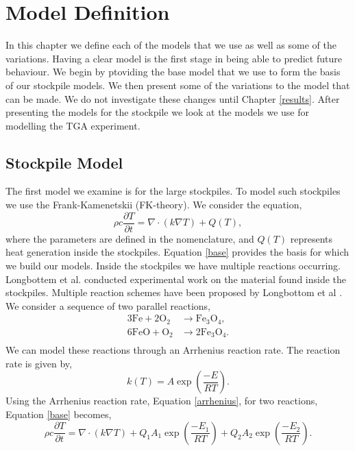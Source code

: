 \chapter{Model Definition}
In this chapter we define each of the models that we use as well as some of the variations. Having a clear model is the first stage in being able to predict future behaviour. We begin by ptoviding the base model that we use to form the basis of our stockpile models. We then present some of the variations to the model that can be made. We do not investigate these changes until Chapter \ref{results}. After presenting the models for the stockpile we look at the models we use for modelling the TGA experiment.

\section{Stockpile Model}
\label{Sec:stockpile}
The first model we examine is for the large stockpiles. To model such stockpiles we use the Frank-Kamenetskii (FK-theory). We consider the equation,
\begin{equation}
\rho c \frac{\partial T}{\partial t}=\nabla \cdot \left(k\nabla T\right) +Q(T), \label{base}
\end{equation}   
where the parameters are defined in the nomenclature, and $Q(T)$ represents heat generation inside the stockpiles. Equation \ref{base} provides the basis for which we build our models. Inside the stockpiles we have multiple reactions occurring. Longbottem et al. \cite{Ray19} conducted experimental work on the material found inside the stockpiles. Multiple reaction schemes have been proposed by Longbottom et al \cite{Ray19}. We consider a sequence of two parallel reactions,
\begin{align*}
3\text{Fe}+2\text{O}_2 &\rightarrow \text{Fe}_3\text{O}_4, \\
6\text{FeO}+\text{O}_2 &\rightarrow 2\text{Fe}_3\text{O}_4. \\
\end{align*} 
We can model these reactions through an Arrhenius reaction rate. The reaction rate is given by,
\begin{equation}
k(T)=A\exp\left(\frac{-E}{RT}\right). \label{arrhenius}
\end{equation} 
Using the Arrhenius reaction rate, Equation \ref{arrhenius}, for two reactions, Equation \ref{base} becomes,
\begin{equation}
\rho c \frac{\partial T}{\partial t}=\nabla \cdot \left(k\nabla T\right) +Q_1A_1\exp\left(\frac{-E_1}{RT}\right)+Q_2A_2\exp\left(\frac{-E_2}{RT}\right). \label{FK_eq}
\end{equation}
